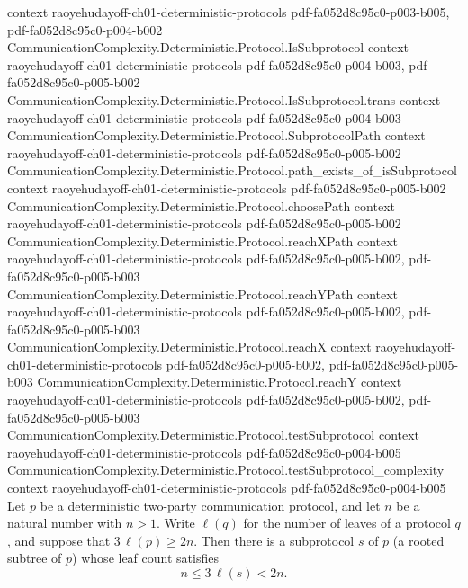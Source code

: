 \begin{lemma}
  {context}
  {raoyehudayoff-ch01-deterministic-protocols}
  {pdf-fa052d8c95c0-p003-b005,
    pdf-fa052d8c95c0-p004-b002}
\proofstep
  {CommunicationComplexity.Deterministic.Protocol.IsSubprotocol}
  {context}
  {raoyehudayoff-ch01-deterministic-protocols}
  {pdf-fa052d8c95c0-p004-b003,
    pdf-fa052d8c95c0-p005-b002}
\proofstep
  {CommunicationComplexity.Deterministic.Protocol.IsSubprotocol.trans}
  {context}
  {raoyehudayoff-ch01-deterministic-protocols}
  {pdf-fa052d8c95c0-p004-b003}
\proofstep
  {CommunicationComplexity.Deterministic.Protocol.SubprotocolPath}
  {context}
  {raoyehudayoff-ch01-deterministic-protocols}
  {pdf-fa052d8c95c0-p005-b002}
\proofstep
  {CommunicationComplexity.Deterministic.Protocol.path_exists_of_isSubprotocol}
  {context}
  {raoyehudayoff-ch01-deterministic-protocols}
  {pdf-fa052d8c95c0-p005-b002}
\proofstep
  {CommunicationComplexity.Deterministic.Protocol.choosePath}
  {context}
  {raoyehudayoff-ch01-deterministic-protocols}
  {pdf-fa052d8c95c0-p005-b002}
\proofstep
  {CommunicationComplexity.Deterministic.Protocol.reachXPath}
  {context}
  {raoyehudayoff-ch01-deterministic-protocols}
  {pdf-fa052d8c95c0-p005-b002,
    pdf-fa052d8c95c0-p005-b003}
\proofstep
  {CommunicationComplexity.Deterministic.Protocol.reachYPath}
  {context}
  {raoyehudayoff-ch01-deterministic-protocols}
  {pdf-fa052d8c95c0-p005-b002,
    pdf-fa052d8c95c0-p005-b003}
\proofstep
  {CommunicationComplexity.Deterministic.Protocol.reachX}
  {context}
  {raoyehudayoff-ch01-deterministic-protocols}
  {pdf-fa052d8c95c0-p005-b002,
    pdf-fa052d8c95c0-p005-b003}
\proofstep
  {CommunicationComplexity.Deterministic.Protocol.reachY}
  {context}
  {raoyehudayoff-ch01-deterministic-protocols}
  {pdf-fa052d8c95c0-p005-b002,
    pdf-fa052d8c95c0-p005-b003}
\proofstep
  {CommunicationComplexity.Deterministic.Protocol.testSubprotocol}
  {context}
  {raoyehudayoff-ch01-deterministic-protocols}
  {pdf-fa052d8c95c0-p004-b005}
\proofstep
  {CommunicationComplexity.Deterministic.Protocol.testSubprotocol_complexity}
  {context}
  {raoyehudayoff-ch01-deterministic-protocols}
  {pdf-fa052d8c95c0-p004-b005}
Let $p$ be a deterministic two-party communication protocol, and let $n$ be a natural
number with $n > 1$. Write $\ell(q)$ for the number of leaves of a protocol $q$, and
suppose that $3\,\ell(p) \ge 2n$. Then there is a subprotocol $s$ of $p$ (a rooted
subtree of $p$) whose leaf count satisfies
\[
n \le 3\,\ell(s) < 2n.
\]
\end{lemma}

